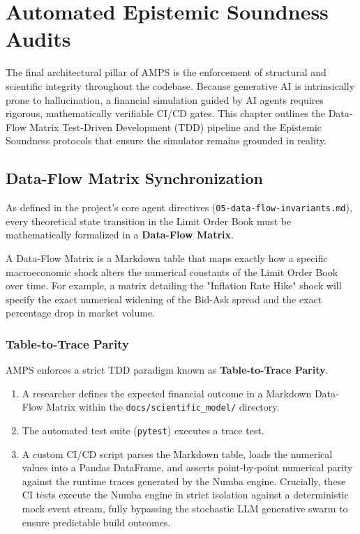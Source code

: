\chapter{Automated Epistemic Soundness Audits}
\label{ch:epistemic_soundness}

The final architectural pillar of AMPS is the enforcement of structural and scientific integrity throughout the codebase. Because generative AI is intrinsically prone to hallucination, a financial simulation guided by AI agents requires rigorous, mathematically verifiable CI/CD gates. This chapter outlines the Data-Flow Matrix Test-Driven Development (TDD) pipeline and the Epistemic Soundness protocols that ensure the simulator remains grounded in reality.

\section{Data-Flow Matrix Synchronization}

As defined in the project's core agent directives (\texttt{05-data-flow-invariants.md}), every theoretical state transition in the Limit Order Book must be mathematically formalized in a \textbf{Data-Flow Matrix}. 

A Data-Flow Matrix is a Markdown table that maps exactly how a specific macroeconomic shock alters the numerical constants of the Limit Order Book over time. For example, a matrix detailing the "Inflation Rate Hike" shock will specify the exact numerical widening of the Bid-Ask spread and the exact percentage drop in market volume.

\subsection{Table-to-Trace Parity}

AMPS enforces a strict TDD paradigm known as \textbf{Table-to-Trace Parity}. 
\begin{enumerate}
    \item A researcher defines the expected financial outcome in a Markdown Data-Flow Matrix within the \texttt{docs/scientific\_model/} directory.
    \item The automated test suite (\texttt{pytest}) executes a trace test.
    \item A custom CI/CD script parses the Markdown table, loads the numerical values into a Pandas DataFrame, and asserts point-by-point numerical parity against the runtime traces generated by the Numba engine. Crucially, these CI tests execute the Numba engine in strict isolation against a deterministic mock event stream, fully bypassing the stochastic LLM generative swarm to ensure predictable build outcomes.
\end{enumerate}

